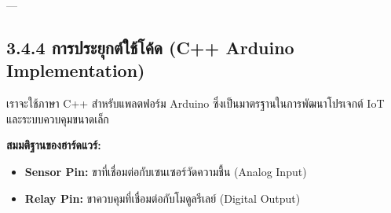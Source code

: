\documentclass[11pt,a4paper,openany]{report}
\begin{document}
---

\subsection{3.4.4 การประยุกต์ใช้โค้ด (C++ Arduino Implementation)}


เราจะใช้ภาษา C++ สำหรับแพลตฟอร์ม Arduino ซึ่งเป็นมาตรฐานในการพัฒนาโปรเจกต์ IoT และระบบควบคุมขนาดเล็ก

\textbf{สมมติฐานของฮาร์ดแวร์:}
\begin{itemize}
  \item \textbf{Sensor Pin:} ขาที่เชื่อมต่อกับเซนเซอร์วัดความชื้น (Analog Input)
  \item \textbf{Relay Pin:} ขาควบคุมที่เชื่อมต่อกับโมดูลรีเลย์ (Digital Output)
\end{itemize}
\end{document}
